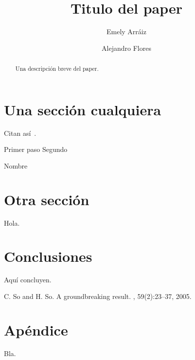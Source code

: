 \documentclass{ci5652}
\title{Titulo del paper}
\author{Emely Arráiz
        \and
        Alejandro Flores}
\begin{document}
\thispagestyle{empty}
\maketitle


\begin{abstract}
Una descripción breve del paper.
\end{abstract}

\section{Una sección cualquiera}
Citan así~\cite{so2005}.

\begin{algorithm}
 \DontPrintSemicolon
 \vspace*{0.1cm}
 Primer paso\;
 Segundo\;
 \vspace*{0.1cm}
 \caption{Nombre}
\end{algorithm}


\section{Otra sección}

Hola.

\section*{Conclusiones}

Aquí concluyen.


\small


\begin{thebibliography}{99}

C. So and H. So.
\newblock A groundbreaking result.
, 59(2):23--37, 2005.

\end{thebibliography}


\newpage
\section*{Apéndice}

Bla.
\end{document}
